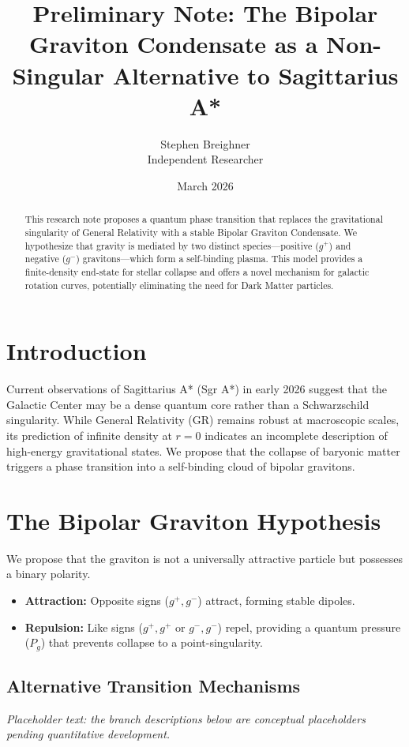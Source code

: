\documentclass[11pt]{article}
\title{\textbf{Preliminary Note: The Bipolar Graviton Condensate as a Non-Singular Alternative to Sagittarius A*}}
\author{Stephen Breighner \\ \small{Independent Researcher}}
\date{March 2026}
\begin{document}
\maketitle

\begin{abstract}
This research note proposes a quantum phase transition that replaces the gravitational singularity of General Relativity with a stable Bipolar Graviton Condensate. We hypothesize that gravity is mediated by two distinct species---positive ($g^+$) and negative ($g^-$) gravitons---which form a self-binding plasma. This model provides a finite-density end-state for stellar collapse and offers a novel mechanism for galactic rotation curves, potentially eliminating the need for Dark Matter particles.
\end{abstract}

\section{Introduction}
Current observations of Sagittarius A* (Sgr A*) in early 2026 suggest that the Galactic Center may be a dense quantum core rather than a Schwarzschild singularity. While General Relativity (GR) remains robust at macroscopic scales, its prediction of infinite density at $r=0$ indicates an incomplete description of high-energy gravitational states. We propose that the collapse of baryonic matter triggers a phase transition into a self-binding cloud of bipolar gravitons.

\section{The Bipolar Graviton Hypothesis}
We propose that the graviton is not a universally attractive particle but possesses a binary polarity.
\begin{itemize}
    \item \textbf{Attraction:} Opposite signs ($g^+, g^-$) attract, forming stable dipoles.
    \item \textbf{Repulsion:} Like signs ($g^+, g^+$ or $g^-, g^-$) repel, providing a quantum pressure ($P_g$) that prevents collapse to a point-singularity.
\end{itemize}

\subsection{Alternative Transition Mechanisms}
\textit{Placeholder text: the branch descriptions below are conceptual placeholders pending quantitative development.}
\end{document}
